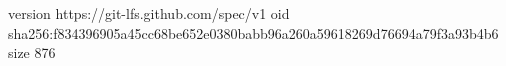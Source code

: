 version https://git-lfs.github.com/spec/v1
oid sha256:f834396905a45cc68be652e0380babb96a260a59618269d76694a79f3a93b4b6
size 876
